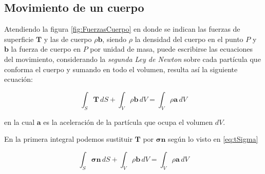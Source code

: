 \subsection{Movimiento de un cuerpo}

	
	Atendiendo la figura \ref{fig:FuerzasCuerpo} en donde se indican las fuerzas de superficie  	$\mathbf{T}$ y las de cuerpo $\rho \mathbf{b}$, siendo $\rho$ la densidad del cuerpo en el punto $P$ y $\mathbf{b}$ la fuerza de cuerpo en $P$ por unidad de masa, puede escribirse las ecuaciones del movimiento, considerando la \textit{segunda Ley de Newton} sobre cada partícula que conforma el cuerpo y sumando en  todo el volumen, resulta así la siguiente
	ecuación:
	
	\begin{equation}
		\int_S \mathbf{T} \, dS + \int_V \rho \mathbf{b} \, dV
		= \int_V \rho \mathbf{a} \, dV
	\end{equation}
	
	en la cual $\mathbf{a}$ es la aceleración de la partícula que ocupa el volumen $dV$.
	
	En la primera integral podemos sustituir $\mathbf{T}$
	por $\bm{\sigma} \mathbf{n}$ según lo visto en \eqref{eq:tSigma}
	
	\begin{equation}
		\int_S \bm{\sigma} \mathbf{n} \, dS + \int_V \rho \mathbf{b} \, dV
		= \int_V \rho \mathbf{a} \, dV
		\label{eq:parcial}
	\end{equation}
	
